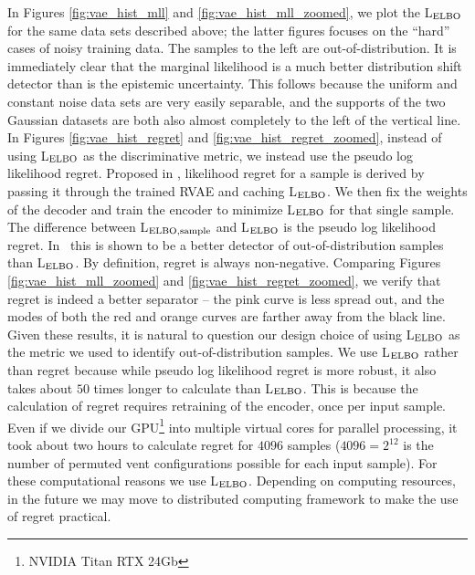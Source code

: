 \begin{figure*}
\label{fig:common_moneyplot1}
\end{figure*}

In Figures \ref{fig:vae_hist_mll} and \ref{fig:vae_hist_mll_zoomed}, we plot the L$_{\rm ELBO}$ for the same data sets described above; the latter figures focuses on the ``hard'' cases of noisy training data. The samples to the left are out-of-distribution. It is immediately clear that the marginal likelihood is a much better distribution shift detector than is the epistemic uncertainty.  This follows because the uniform and constant noise data sets are very easily separable, and the supports of the two Gaussian datasets are both also almost completely to the left of the vertical line. In Figures \ref{fig:vae_hist_regret} and \ref{fig:vae_hist_regret_zoomed}, instead of using L$_{\rm ELBO}$ as the discriminative metric, we instead use the {\rm pseudo log likelihood regret}. Proposed in \cite{likelihood_regret}, likelihood regret for a sample is derived by passing it through the trained RVAE and caching L$_{\rm ELBO}$. We then fix the weights of the decoder and train the encoder to minimize L$_{\rm ELBO}$ for  that single sample. The difference between L$_{\rm ELBO, sample}$ and L$_{\rm ELBO}$ is the pseudo log likelihood regret.  In~\cite{likelihood_regret} this is shown to be a better detector of out-of-distribution samples than L$_{\rm ELBO}$. By definition, regret is always non-negative. Comparing Figures \ref{fig:vae_hist_mll_zoomed} and \ref{fig:vae_hist_regret_zoomed}, we verify that regret is indeed a better separator -- the pink curve is less spread out, and the modes of both the red and orange curves are farther away from the black line. Given these results, it is natural to question our design choice of using L$_{\rm ELBO}$ as the metric we used to identify out-of-distribution samples. We use L$_{\rm ELBO}$ rather than regret because while pseudo log likelihood regret is more robust, it also takes about $50$ times longer to calculate than L$_{\rm ELBO}$. This is because the calculation of regret  requires retraining of the encoder, once per input sample.  Even if we divide our GPU\footnote{NVIDIA Titan RTX 24Gb} into multiple virtual cores for parallel processing, it took about two hours to calculate regret for $4096$ samples ($4096 = 2^{12}$ is the number of permuted vent configurations possible for each input sample). For these computational reasons we use L$_{\rm ELBO}$.  Depending on computing resources, in the future we may move to distributed computing framework to make the use of regret practical.

